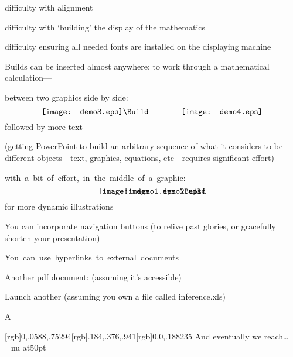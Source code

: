 \begin{slide}
\Bblob difficulty with alignment

\Bblob difficulty with `building' the display of the mathematics

\Bblob difficulty ensuring all needed fonts are installed on the displaying machine

\newslide{}

\blob Builds can be inserted almost anywhere: \Build
to work through a mathematical calculation---

\newslide
{}
\blob between two graphics side by side:
$$\texttt{[image: demo3.eps]}
  \Build\qquad\qquad
  \texttt{[image: demo4.eps]}$$
\Build followed by more text

\vfill
{\tiny(getting PowerPoint to build an arbitrary sequence of what it considers
to be different objects---text, graphics, equations, etc---requires significant effort)

}

\newslide
{}
\blob\hbox{with a bit of effort, in the middle of a graphic:}
$$\texttt{[image: demo1.eps]}\Build
  \llap{\texttt{[image: demo2.eps]}}
$$
{\scriptsize for more dynamic illustrations}

\newslide
{}

\blob You can incorporate navigation buttons \Build\hb
{\scriptsize(to relive past glories, or gracefully shorten your presentation)}

\Blob\hbox{You can use hyperlinks to external documents}

\Bblob Another pdf document: 
{\scriptsize (assuming it's accessible)}

\Bblob Launch another \hb
{\scriptsize (assuming you own a file called
inference.xls)}

\Bblob A 

\newslide
\def\MyHeadXtra{\LinkBorderWidth{.5pt}\LinkTextColour{Uwhite}\GeneralDocInfo{About}}
[rgb]{0,.0588,.75294}[rgb]{.184,.376,.941}[rgb]{0,0,.188235}
And eventually we reach\dots\Build
\vfill
\font\Fancy=nu at50pt
\vfill
\end{slide}




